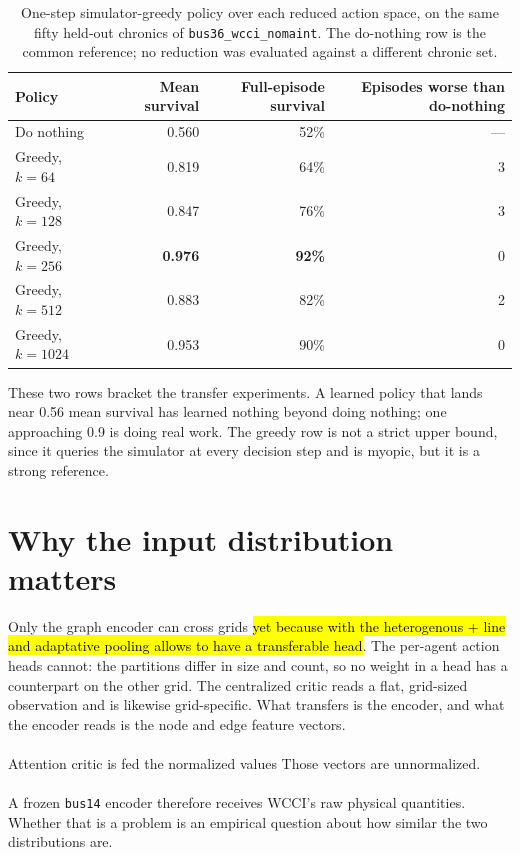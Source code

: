 \begin{table}[H]
  \centering
  \small
  \caption{One-step simulator-greedy policy over each reduced action space, on
  the same fifty held-out chronics of \texttt{bus36\_wcci\_nomaint}. The
  do-nothing row is the common reference; no reduction was evaluated against a
  different chronic set.}
  \label{tab:wcci-greedy-sizes}
  \setlength{\tabcolsep}{8pt}
  \begin{tabular}{lrrr}
    \toprule
    Policy & Mean survival & Full-episode survival & Episodes worse than do-nothing \\
    \midrule
    Do nothing        & 0.560 & 52\% & --- \\
    Greedy, $k=64$    & 0.819 & 64\% & 3 \\
    Greedy, $k=128$   & 0.847 & 76\% & 3 \\
    Greedy, $k=256$   & \textbf{0.976} & \textbf{92\%} & 0 \\
    Greedy, $k=512$   & 0.883 & 82\% & 2 \\
    Greedy, $k=1024$  & 0.953 & 90\% & 0 \\
    \bottomrule
  \end{tabular}
\end{table}

\noindent These two rows bracket the transfer experiments. A learned policy that lands
near 0.56 mean survival has learned nothing beyond doing nothing; one
approaching 0.9 is doing real work. The greedy row is not a strict upper bound,
since it queries the simulator at every decision step and is myopic, but it is a
strong reference.


\section{Why the input distribution matters}
\label{sec:wcci-why-distribution}

Only the graph encoder can cross grids \hl{yet because with the heterogenous + line and adaptative pooling allows to have a transferable head}. The per-agent action heads cannot: the
partitions differ in size and count, so no weight in a head has a counterpart on
the other grid. The centralized critic reads a flat, grid-sized observation and
is likewise grid-specific. What transfers is the encoder, and what the encoder
reads is the node and edge feature vectors.
\\
\\
{\color{red} Attention critic is fed the normalized values}
Those vectors are unnormalized.
\\
\\
A frozen \texttt{bus14} encoder therefore receives WCCI's raw physical
quantities. Whether that is a problem is an empirical question about how similar
the two distributions are.


